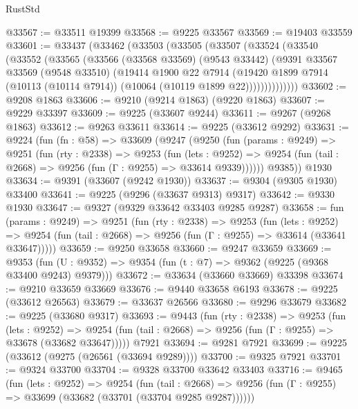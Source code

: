 \begin{lexlean}{RustStd}
\begin{coremodule}
@33567 := @33511 @19399
@33568 := @9225 @33567
@33569 := @19403 @33559
@33601 := @33437
    (@33462
      (@33503
        (@33505
          (@33507
            (@33524
              (@33540
                (@33552
                  (@33565
                    (@33566
                      (@33568 @33569)
                      (@9543 @33442)
                      (@9391
                        @33567
                        @33569
                        (@9548 @33510)
                        (@19414
                          @1900
                          @22
                          @7914
                          (@19420
                            @1899
                            @7914
                            (@10113 (@10114 @7914))
                            (@10064 (@10119 @1899 @22))))))))))))))
@33602 := @9208 @1863
@33606 := @9210 (@9214 @1863) (@9220 @1863)
@33607 := @9229 @33397
@33609 := @9225 (@33607 @9244)
@33611 := @9267 (@9268 @1863)
@33612 := @9263 @33611
@33614 := @9225 (@33612 @9292)
@33631 := @9224
    (fun (fn : @58) =>
    @33609
      (@9247
        (@9250
          (fun (params : @9249) =>
          @9251
            (fun (rty : @2338) =>
            @9253
              (fun (lets : @9252) =>
              @9254 (fun (tail : @2668) => @9256 (fun (Γ : @9255) => @33614 @9339))))))
        @9385))
    @1930
@33634 := @9391 (@33607 (@9242 @1930))
@33637 := @9304 (@9305 @1930) @33400
@33641 := @9225 (@9296 (@33637 @9313) @9317)
@33642 := @9330 @1930
@33647 := @9327 (@9329 @33642 @33403 @9285 @9287)
@33658 := fun (params : @9249) =>
  @9251
    (fun (rty : @2338) =>
    @9253
      (fun (lets : @9252) =>
      @9254 (fun (tail : @2668) => @9256 (fun (Γ : @9255) => @33614 (@33641 @33647)))))
@33659 := @9250 @33658
@33660 := @9247 @33659
@33669 := @9353
    (fun (U : @9352) => @9354 (fun (t : @7) => @9362 (@9225 (@9368 @33400 @9243) @9379)))
@33672 := @33634 (@33660 @33669) @33398
@33674 := @9210 @33659 @33669
@33676 := @9440 @33658 @6193
@33678 := @9225 (@33612 @26563)
@33679 := @33637 @26566
@33680 := @9296 @33679
@33682 := @9225 (@33680 @9317)
@33693 := @9443
    (fun (rty : @2338) =>
    @9253
      (fun (lets : @9252) =>
      @9254 (fun (tail : @2668) => @9256 (fun (Γ : @9255) => @33678 (@33682 @33647)))))
    @7921
@33694 := @9281 @7921
@33699 := @9225 (@33612 (@9275 (@26561 (@33694 @9289))))
@33700 := @9325 @7921
@33701 := @9324 @33700
@33704 := @9328 @33700 @33642 @33403
@33716 := @9465
    (fun (lets : @9252) =>
    @9254
      (fun (tail : @2668) =>
      @9256 (fun (Γ : @9255) => @33699 (@33682 (@33701 (@33704 @9285 @9287))))))

\end{coremodule}
\end{lexlean}
